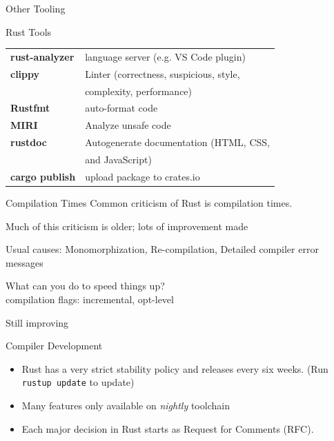 \documentclass{beamer}
\begin{document}
\begin{frame}{Other Tooling} 
\begin{block}{Rust Tools}
\pause 

\begin{tabular}{@{}l l@{}}
\textbf{rust-analyzer}     &  language server (e.g. VS Code plugin) \\ \pause
\textbf{clippy}     &  Linter (correctness, suspicious, style, \\
					&			complexity, performance) \\ \pause
\textbf{Rustfmt}    & auto-format code \\ \pause
\textbf{MIRI}    	& Analyze unsafe code \\ \pause
\textbf{rustdoc}  & Autogenerate documentation (HTML, CSS, \\
					&			and JavaScript)\\ \pause
\textbf{cargo publish} & upload package to crates.io \\
\end{tabular}
\end{block}
\end{frame}



\begin{frame}{Compilation Times} 
\pause 
Common criticism of Rust is compilation times. \pause

Much of this criticism is older; lots of improvement made \pause

Usual causes: Monomorphization, Re-compilation, Detailed compiler error messages \pause

What can you do to speed things up?\\ compilation flags: incremental, opt-level
\pause

Still improving

\end{frame}


\begin{frame}{Compiler Development} 
\begin{itemize} [label=$\bullet$] 
\item<2-> 
Rust has a very strict stability policy and releases every six weeks. (Run
\texttt{rustup update} to update)
\item<3-> 
Many features only available on \emph{nightly} toolchain
\item<4-> 
Each major decision in Rust starts as Request for Comments (RFC).
\end{itemize} 
\end{frame} 
\end{document}
